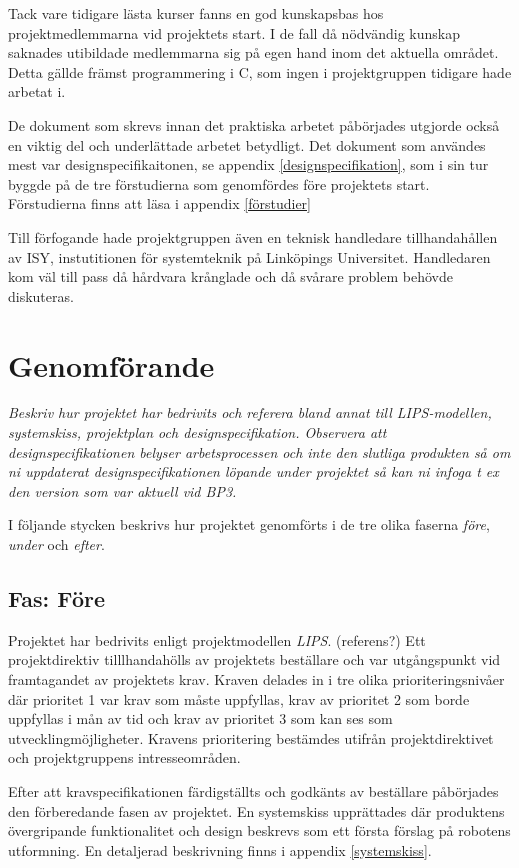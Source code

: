 \documentclass[11pt]{article}
\begin{document}
\begin{flushleft}
Tack vare tidigare lästa kurser fanns en god kunskapsbas hos projektmedlemmarna vid projektets start. I de fall då nödvändig kunskap saknades utibildade medlemmarna sig på egen hand inom det aktuella området. Detta gällde främst programmering i C, som ingen i projektgruppen tidigare hade arbetat i. 

De dokument som skrevs innan det praktiska arbetet påbörjades utgjorde också en viktig del och underlättade arbetet betydligt. Det dokument som användes mest var designspecifikaitonen, se appendix \ref{designspecifikation}, som i sin tur byggde på de tre förstudierna som genomfördes före projektets start. Förstudierna finns att läsa i appendix \ref{förstudier}

Till förfogande hade projektgruppen även en teknisk handledare tillhandahållen av ISY, instutitionen för systemteknik på Linköpings Universitet. Handledaren kom väl till pass då hårdvara krånglade och då svårare problem behövde diskuteras.

\pagebreak

\section{Genomförande}
\textit{Beskriv hur projektet har bedrivits och referera bland annat till LIPS-modellen, systemskiss, projektplan och designspecifikation. Observera att designspecifikationen belyser arbetsprocessen och inte den slutliga produkten så om ni uppdaterat designspecifikationen löpande under projektet så kan ni infoga t ex den version som var aktuell vid BP3.}

I följande stycken beskrivs hur projektet genomförts i de tre olika faserna \textit{före}, \textit{under} och \textit{efter}.

\subsection{Fas: Före}
Projektet har bedrivits enligt projektmodellen \textit{LIPS}. (referens?) Ett projektdirektiv tilllhandahölls av projektets beställare och var utgångspunkt vid framtagandet av projektets krav. Kraven delades in i tre olika prioriteringsnivåer där prioritet 1 var krav som måste uppfyllas, krav av prioritet 2 som borde uppfyllas i mån av tid och krav av prioritet 3 som kan ses som utvecklingmöjligheter. Kravens prioritering bestämdes utifrån projektdirektivet och projektgruppens intresseområden. 

Efter att kravspecifikationen färdigställts och godkänts av beställare påbörjades den förberedande fasen av projektet. En systemskiss upprättades där produktens övergripande funktionalitet och design beskrevs som ett första förslag på robotens utformning. En detaljerad beskrivning finns i appendix \ref{systemskiss}. 


\end{flushleft}
\end{document}
